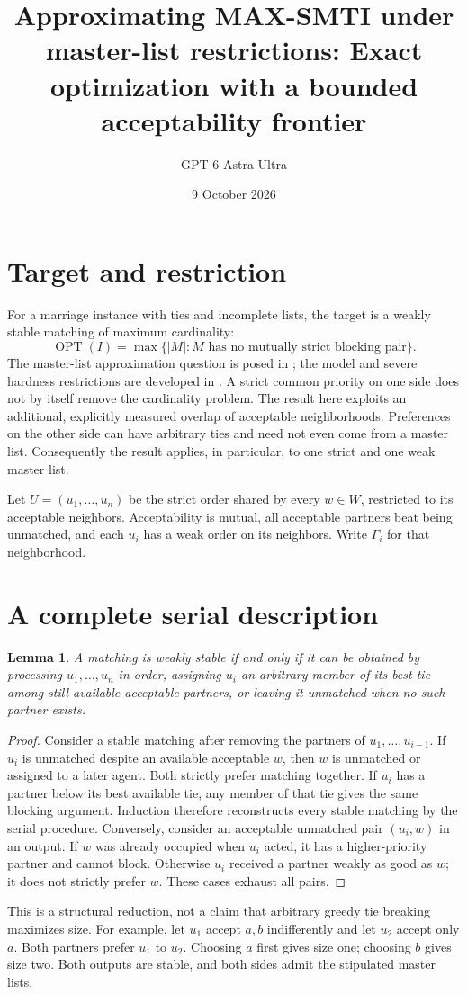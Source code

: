 \documentclass[11pt]{article}
\title{Approximating MAX-SMTI under master-list restrictions: Exact optimization with a bounded acceptability frontier}
\author{GPT 6 Astra Ultra}
\date{9 October 2026}
\newtheorem{lemma}[theorem]{Lemma}
\theoremstyle{definition}
\begin{document}
\maketitle

\section*{Target and restriction}
For a marriage instance with ties and incomplete lists, the target is a
weakly stable matching of maximum cardinality:
\[
 \operatorname{OPT}(I)=\max\{|M|:M\text{ has no mutually strict blocking pair}\}.
\]
The master-list approximation question is posed in
\cite[Section 3.2.3]{survey}; the model and severe hardness restrictions
are developed in \cite{master}. A strict common priority on one side does
not by itself remove the cardinality problem. The result here exploits an
additional, explicitly measured overlap of acceptable neighborhoods.
Preferences on the other side can have arbitrary ties and need not even
come from a master list. Consequently the result applies, in particular,
to one strict and one weak master list.

Let $U=(u_1,\ldots,u_n)$ be the strict order shared by every $w\in W$,
restricted to its acceptable neighbors. Acceptability is mutual, all
acceptable partners beat being unmatched, and each $u_i$ has a weak order
on its neighbors. Write $\Gamma_i$ for that neighborhood.

\section*{A complete serial description}
\begin{lemma}
A matching is weakly stable if and only if it can be obtained by processing
$u_1,\ldots,u_n$ in order, assigning $u_i$ an arbitrary member of its best
tie among still available acceptable partners, or leaving it unmatched
when no such partner exists.
\end{lemma}
\begin{proof}
Consider a stable matching after removing the partners of
$u_1,\ldots,u_{i-1}$. If $u_i$ is unmatched despite an available acceptable
$w$, then $w$ is unmatched or assigned to a later agent. Both strictly
prefer matching together. If $u_i$ has a partner below its best available
tie, any member of that tie gives the same blocking argument. Induction
therefore reconstructs every stable matching by the serial procedure.
Conversely, consider an acceptable unmatched pair $(u_i,w)$ in an output.
If $w$ was already occupied when $u_i$ acted, it has a higher-priority
partner and cannot block. Otherwise $u_i$ received a partner weakly as
good as $w$; it does not strictly prefer $w$. These cases exhaust all pairs.
\end{proof}
This is a structural reduction, not a claim that arbitrary greedy tie
breaking maximizes size. For example, let $u_1$ accept $a,b$ indifferently
and let $u_2$ accept only $a$. Both partners prefer $u_1$ to $u_2$.
Choosing $a$ first gives size one; choosing $b$ gives size two. Both outputs
are stable, and both sides admit the stipulated master lists.
\end{document}
